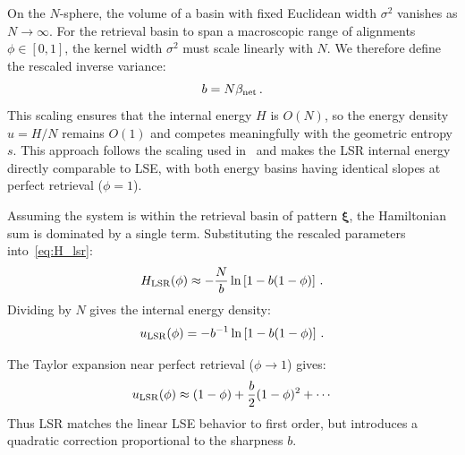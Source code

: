 \documentclass{article}
\theoremstyle{plain}
\theoremstyle{definition}
\theoremstyle{remark}
\begin{document}
On the $N$-sphere, the volume of a basin with fixed Euclidean width $\sigma^2$ vanishes as $N \to \infty$. For the retrieval basin to span a macroscopic range of alignments $\phi \in [0, 1]$, the kernel width $\sigma^2$ must scale linearly with $N$. We therefore define the rescaled inverse variance:
\begin{equation}
    b = N \beta_{\rm net}\,.
\end{equation}
This scaling ensures that the internal energy $H$ is $O(N)$, so the energy density $u = H/N$ remains $O(1)$ and competes meaningfully with the geometric entropy $s$. This approach follows the scaling used in~\citet{hoover2025dense} and makes the LSR internal energy directly comparable to LSE, with both energy basins having identical slopes at perfect retrieval ($\phi = 1$).

Assuming the system is within the retrieval basin of pattern $\bm{\xi}$, the Hamiltonian sum is dominated by a single term. Substituting the rescaled parameters into~\eqref{eq:H_lsr}:
\begin{equation}
    H_{\rm LSR}(\phi) \approx -\frac{N}{b} \ln \left[ 1 - b(1-\phi) \right]\,.
\end{equation}
Dividing by $N$ gives the internal energy density:
\begin{equation}
    u_{\rm LSR}(\phi) = -b^{-1} \ln \left[ 1 - b(1-\phi) \right]\,.
\end{equation}

The Taylor expansion near perfect retrieval ($\phi \to 1$) gives:
\begin{equation}
    u_{\rm LSR}(\phi) \approx (1-\phi) + \frac{b}{2}(1-\phi)^2 + \cdots
\end{equation}
Thus LSR matches the linear LSE behavior to first order, but introduces a quadratic correction proportional to the sharpness $b$.



\end{document}
